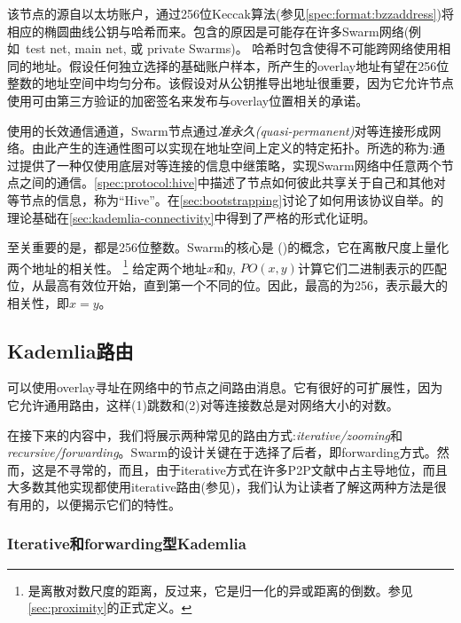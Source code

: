 该节点的源自以太坊账户，通过256位Keccak算法(参见\ref{spec:format:bzzaddress})将相应的椭圆曲线公钥与哈希而来。包含的原因是可能存在许多Swarm网络(例如\ test net, main net, 或 private Swarms)。 哈希时包含使得不可能跨网络使用相同的地址。假设任何独立选择的基础账户样本，所产生的overlay地址有望在256位整数的地址空间中均匀分布。该假设对从公钥推导出地址很重要，因为它允许节点使用可由第三方验证的加密签名来发布与overlay位置相关的承诺。

使用的长效通信通道，Swarm节点通过\emph{准永久(quasi-permanent)}对等连接形成网络。由此产生的连通性图可以实现在地址空间上定义的特定拓扑。所选的称为:通过提供了一种仅使用底层对等连接的信息中继策略，实现Swarm网络中任意两个节点之间的通信。\ref{spec:protocol:hive}中描述了节点如何彼此共享关于自己和其他对等节点的信息，称为“Hive”。在\ref{sec:bootstrapping}讨论了如何用该协议自举。的理论基础在\ref{sec:kademlia-connectivity}中得到了严格的形式化证明。

至关重要的是，都是256位整数。Swarm的核心是 ()的概念，它在离散尺度上量化两个地址的相关性。%
%
\footnote{是离散对数尺度的距离，反过来，它是归一化的异或距离的倒数。参见\ref{sec:proximity}的正式定义。} 
%
给定两个地址$x$和$y$, $\mathit{PO}(x,y)$计算它们二进制表示的匹配位，从最高有效位开始，直到第一个不同的位。因此，最高的为256，表示最大的相关性，即$x=y$。

\subsection{Kademlia路由\statusgreen}\label{sec:kademlia-routing}

可以使用overlay寻址在网络中的节点之间路由消息。它有很好的可扩展性，因为它允许通用路由，这样(1)跳数和(2)对等连接数总是对网络大小的对数。

在接下来的内容中，我们将展示两种常见的路由方式:\emph{iterative/zooming}和\emph{recursive/forwarding}。Swarm的设计关键在于选择了后者，即forwarding方式。然而，这是不寻常的，而且，由于iterative方式在许多P2P文献中占主导地位，而且大多数其他实现都使用iterative路由(参见\cite{maymounkov2002kademlia,baumgart2007s,lua2005survey})，我们认为让读者了解这两种方法是很有用的，以便揭示它们的特性。

\subsubsection{Iterative和forwarding型Kademlia}

